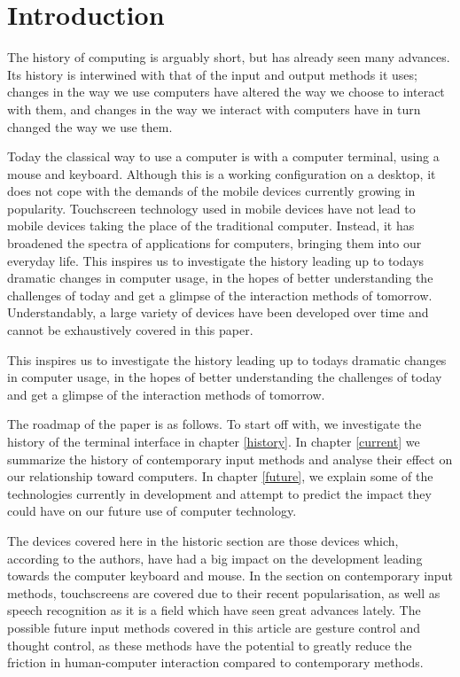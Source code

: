 
\section{Introduction}

The history of computing is arguably short, but has already seen many advances. Its history is interwined with that of the input and output methods it uses; changes in the way we use computers have altered the way we choose to interact with them, and changes in the way we interact with computers have in turn changed the way we use them.

Today the classical way to use a computer is with a computer terminal, using a mouse and keyboard. Although this is a working configuration on a desktop, it does not cope with the demands of the mobile devices currently growing in popularity. Touchscreen technology used in mobile devices have not lead to mobile devices taking the place of the traditional computer. Instead, it has broadened the spectra of applications for computers, bringing them into our everyday life. This inspires us to investigate the history leading up to todays dramatic changes in computer usage, in the hopes of better understanding the challenges of today and get a glimpse of the interaction methods of tomorrow. Understandably, a large variety of devices have been developed over time and cannot be exhaustively covered in this paper.

This inspires us to investigate the history leading up to todays dramatic changes in computer usage, in the hopes of better understanding the challenges of today and get a glimpse of the interaction methods of tomorrow.

The roadmap of the paper is as follows. To start off with, we investigate the history of the terminal interface in chapter \ref{history}. In chapter \ref{current} we summarize the history of contemporary input methods and analyse their effect on our relationship toward computers. In chapter \ref{future}, we explain some of the technologies currently in development and attempt to predict the impact they could have on our future use of computer technology.

The devices covered here in the historic section are those devices which, according to the authors, have had a big impact on the development leading towards the computer keyboard and mouse. In the section on contemporary input methods, touchscreens are covered due to their recent popularisation, as well as speech recognition as it is a field which have seen great advances lately. The possible future input methods covered in this article are gesture control and thought control, as these methods have the potential to greatly reduce the friction in human-computer interaction compared to contemporary methods.

